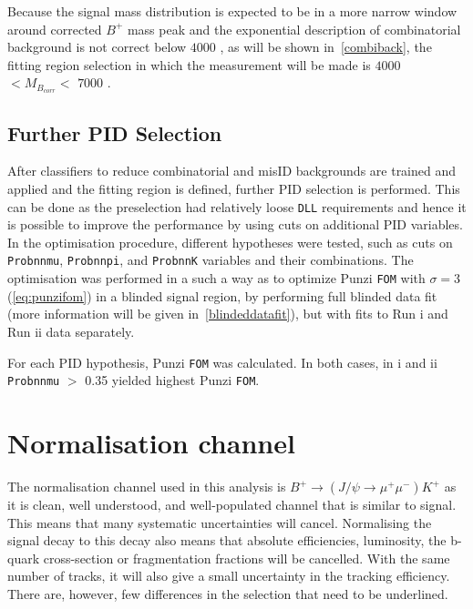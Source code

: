 Because the signal mass distribution is expected to be in a more narrow window around corrected $B^{+}$ mass peak and the exponential description of combinatorial background is not correct below $4000$ \mevcc, as will be shown in~\autoref{combiback}, the fitting region selection in which the measurement will be made is $4000$ \mevcc $<M_{B_{corr}}<$ $7000$ \mevcc.

\subsection{Further \gls{PID} Selection}
\label{furtherpid}
After classifiers to reduce combinatorial and misID backgrounds are trained and applied and the fitting region is defined, further \gls{PID} selection is performed. This can be done as the preselection had relatively loose \texttt{DLL} requirements and hence it is possible to improve the performance by using cuts on additional \gls{PID} variables. In the optimisation procedure, different hypotheses were tested, such as cuts on \texttt{Probnnmu}, \texttt{Probnnpi}, and \texttt{ProbnnK} variables and their combinations. The optimisation was performed in a such a way as to optimize Punzi \texttt{FOM} with $\sigma=3$ (\autoref{eq:punzifom}) in a blinded signal region, by performing full blinded data fit (more information will be given in~\autoref{blindeddatafit}), but with fits to Run \Rn{1} and Run \Rn{2} data separately.


For each PID hypothesis, Punzi \texttt{FOM} was calculated. In both cases, in \Rn{1} and \Rn{2} \texttt{Probnnmu} $>$ 0.35 yielded highest Punzi \texttt{FOM}.







\section{Normalisation channel}
\label{nchannel}
The normalisation channel used in this analysis is $ B^{+} \rightarrow (J/\psi \rightarrow \mu^{+} \mu^{-}) K^{+}$
as it is clean, well understood, and well-populated channel that is similar to signal. This means that many systematic uncertainties will cancel. Normalising the signal decay to this decay also means that absolute efficiencies, luminosity, the b-quark cross-section or fragmentation fractions will be cancelled. With the same number of tracks, it will also give a small uncertainty in the tracking efficiency. There are, however, few differences in the selection that need to be underlined.

